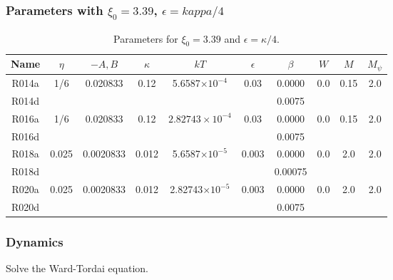 \subsubsection{Parameters with $\xi_0 = 3.39$, $\epsilon = kappa/4$}

\begin{table}[h]
\begin{center}
\begin{tabular}{|c|c|c|c|c|c|c|c|c|c|}
\hline
Name & $\eta$ & $-A,B$ & $\kappa$ & $kT$ & $\epsilon$ & $\beta$ & $W$
     & $M$ & $M_\psi$\\
\hline
R014a & 1/6 & 0.020833 & 0.12 & 5.6587$\times 10^{-4}$ & 0.03 & 0.0000 & 0.0 
      & 0.15 & 2.0 \\
R014d &  &  &  & & & 0.0075 &  &  &  \\
\hline
R016a & 1/6 & 0.020833 & 0.12 & $2.82743\times 10^{-4}$ & 0.03 & 0.0000 & 0.0 
      & 0.15 & 2.0 \\
R016d & &  &  &  & & 0.0075 &  &  &  \\
\hline
R018a & 0.025 & 0.0020833 & 0.012 & 5.6587$\times 10^{-5}$ & 0.003
      & 0.0000 & 0.0 & 2.0 & 2.0 \\
R018d & &  &  &  & & 0.00075 &  &  &  \\
\hline
R020a & 0.025 & 0.0020833 & 0.012 & 2.82743$\times 10^{-5}$ & 0.003
      & 0.0000 & 0.0 & 2.0 & 2.0 \\
R020d & &  &  &  & & 0.0075 &  &  &  \\
\hline
\end{tabular}
\caption{Parameters for $\xi_0 = 3.39$ and $\epsilon = \kappa/4$.}
\end{center}
\end{table}




\subsubsection{Dynamics}

Solve the Ward-Tordai equation.



\vfill
\pagebreak
